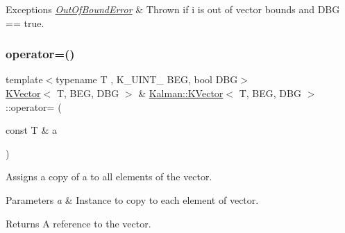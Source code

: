 \begin{DoxyExceptions}{Exceptions}
{\em \mbox{\hyperlink{structKalman_1_1OutOfBoundError}{Out\+Of\+Bound\+Error}}} & Thrown if i is out of vector bounds and {\ttfamily D\+BG == true}. \\
\hline
\end{DoxyExceptions}
\mbox{\label{classKalman_1_1KVector_abd1d65254f9f9b0c3389bcbc8210b03b}} 
\subsubsection{\texorpdfstring{operator=()}{operator=()}\hspace{0.1cm}{\footnotesize\ttfamily [1/2]}}
{\footnotesize\ttfamily template$<$typename T , K\+\_\+\+U\+I\+N\+T\+\_ B\+EG, bool D\+BG$>$ \\
\mbox{\hyperlink{classKalman_1_1KVector}{K\+Vector}}$<$ T, B\+EG, D\+BG $>$ \& \mbox{\hyperlink{classKalman_1_1KVector}{Kalman\+::\+K\+Vector}}$<$ T, B\+EG, D\+BG $>$\+::operator= (\begin{DoxyParamCaption}\item[{const T \&}]{a }\end{DoxyParamCaption})\hspace{0.3cm}{\ttfamily [inline]}}



Assigns a copy of {\ttfamily a} to all elements of the vector. 


\begin{DoxyParams}{Parameters}
{\em a} & Instance to copy to each element of vector. \\
\hline
\end{DoxyParams}
\begin{DoxyReturn}{Returns}
A reference to the vector. 
\end{DoxyReturn}
\mbox{\label{classKalman_1_1KVector_a104d50690d7c6746219b9d8ca9002c93}} 
